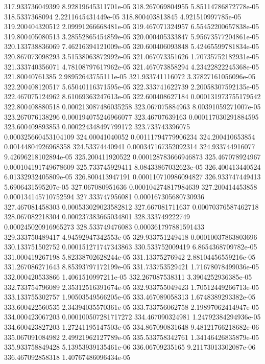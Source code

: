 {317.933736049399 8.92819645311701e-05
318.267069804955 5.85114786872778e-05
318.5337368094 2.2211645431449e-05
318.800403813845 4.921510997785e-05
319.200404320512 2.09991266668481e-05
319.467071324957 6.55452200657838e-05
319.800405080513 3.28552865454859e-05
320.000405333847 5.95673577204861e-05
320.133738836069 7.46216394121009e-05
320.600406093848 5.42465599781834e-05
320.867073098293 3.51538063872992e-05
321.067073351626 1.70735752182931e-05
321.333740356071 4.78108797617962e-05
321.467073858294 4.23422822245368e-05
321.80040761385 2.98952643755111e-05
321.933741116072 3.37827161056096e-05
322.200408120517 5.65040116371595e-05
322.333741622739 2.20058307592135e-05
322.467075124962 8.61069363247613e-05
322.600408627184 0.000131973755179542
322.800408880518 0.000213087486035258
323.067075884963 8.00391059271007e-05
323.267076138296 0.000194075246966077
323.46707639163 0.000117030291884595
323.600409893853 0.000224348497799172
323.733743396075 0.000325660453104109
324.00041040052 0.00111794779906234
324.200410653854 0.00144804926968358
324.53374440941 0.000347167352092314
324.933744916077 9.42696218102894e-05
325.200411920522 0.000128783666946873
325.467078924967 0.000104191749678609
325.733745929411 8.08433867032623e-05
326.400413440524 6.01332932405809e-05
326.800413947191 0.000110710986094827
326.933747449413 5.6906431595207e-05
327.067080951636 0.000104274817984639
327.200414453858 0.000134145710752594
327.333747956081 0.000167305680730936
327.467081458303 0.000533029023582812
327.667081711637 0.00070376587462718
328.067082218304 0.000237383665034801
328.333749222749 0.000245020916965273
328.533749476083 0.000361797881591433
329.333750489417 4.94592947342553e-05
329.933751249418 0.00010037863803696
330.133751502752 0.000151271747343863
330.533752009419 6.8654368709782e-05
331.000419267198 5.82338702628244e-05
331.13375276942 2.88104456559216e-05
331.267086271643 8.85393797172199e-05
331.733753529421 1.71678078499036e-05
332.000420533866 1.4061510997211e-05
332.267087538311 3.3904252936385e-05
332.733754796089 2.35312516391674e-05
332.933755049423 1.70512449266713e-05
333.133755302757 1.90503549566205e-05
333.467089058313 1.6748389293382e-05
333.600422560535 2.34394035570361e-05
333.733756062758 2.19897062414947e-05
334.000423067203 0.000100507281717272
334.467090324981 1.24792384294936e-05
334.600423827203 1.27241195147503e-05
334.867090831648 9.48121766218682e-06
335.067091084982 2.49921962127789e-05
335.533758342761 1.34146426835879e-05
335.933758849428 5.13953939135461e-06
336.06709235165 9.21173013302087e-06
336.467092858318 1.40767486096434e-05
}
